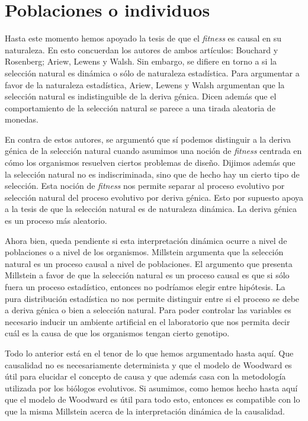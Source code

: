 \section{Poblaciones o individuos}

\noindent Hasta este momento hemos apoyado la tesis de que el \emph{fitness} es causal en su naturaleza. En esto concuerdan los autores de ambos artículos: Bouchard y Rosenberg; Ariew, Lewens y Walsh. Sin embargo, se difiere en torno a si la selección natural es dinámica o sólo de naturaleza estadística. Para argumentar a favor de la naturaleza estadística, Ariew, Lewens y Walsh argumentan que la selección natural es indistinguible de la deriva génica. Dicen además que el comportamiento de la selección natural se parece a una tirada aleatoria de monedas.

En contra de estos autores, se argumentó que sí podemos distinguir a la deriva génica de la selección natural cuando asumimos una noción de \emph{fitness} centrada en cómo los organismos resuelven ciertos problemas de diseño. Dijimos además que la selección natural no es indiscriminada, sino que de hecho hay un cierto tipo de selección. Esta noción de \emph{fitness} nos permite separar al proceso evolutivo por selección natural del proceso evolutivo por deriva génica. Esto por supuesto apoya a la tesis de que la selección natural es de naturaleza dinámica. La deriva génica es un proceso más aleatorio.

Ahora bien, queda pendiente si esta interpretación dinámica ocurre a nivel de poblaciones o a nivel de los organismos. Millstein \citeyear{Millstein2006} argumenta que la selección natural es un proceso causal a nivel de poblaciones. El argumento que presenta Millstein a favor de que la selección natural es un proceso causal es que si sólo fuera un proceso estadístico, entonces no podríamos elegir entre hipótesis. La pura distribución estadística no nos permite distinguir entre si el proceso se debe a deriva génica o bien a selección natural. Para poder controlar las variables es necesario inducir un ambiente artificial en el laboratorio que nos permita decir cuál es la causa de que los organismos tengan cierto genotipo.

Todo lo anterior está en el tenor de lo que hemos argumentado hasta aquí. Que causalidad no es necesariamente determinista y que el modelo de Woodward es útil para elucidar el concepto de causa y que además casa con la metodología utilizada por los biólogos evolutivos. Si asumimos, como hemos hecho hasta aquí que el modelo de Woodward es útil para todo esto, entonces es compatible con lo que la misma Millstein acerca de la interpretación dinámica de la causalidad.

